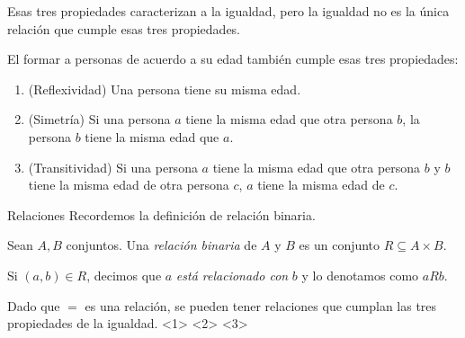 \begin{frame}
    Esas tres propiedades caracterizan a la igualdad, pero la igualdad no es la única relación que cumple esas tres propiedades.\par 
    El formar a personas de acuerdo a su edad también cumple esas tres propiedades:
    \begin{enumerate}
        \item (Reflexividad) Una persona tiene su misma edad.
        \item (Simetría) Si una persona $a$ tiene la misma edad que otra persona $b$, la persona $b$ tiene la misma edad que $a$.
        \item (Transitividad) Si una persona $a$ tiene la misma edad que otra persona $b$ y $b$ tiene la misma edad de otra persona $c$, $a$ tiene la misma edad de $c$.
    \end{enumerate}
\end{frame}
\begin{frame}{Relaciones}
    Recordemos la definición de relación binaria.
    \begin{mdefinition}
        Sean $A, B$ conjuntos. Una \emph{relación binaria} de $A$ y $B$ es un conjunto $R\subseteq A\times B$.\par 
        Si $(a, b)\in R$, decimos que $a$ \emph{está relacionado con} $b$ y lo denotamos como $aRb$.
    \end{mdefinition}
\end{frame}
\begin{frame}
    Dado que $=$ es una relación, se pueden tener relaciones que cumplan las tres propiedades de la igualdad.
    <1>
    <2>
    <3>
\end{frame}
